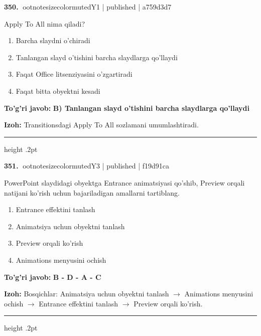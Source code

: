 \documentclass[10pt,a4paper]{article}
\begin{document}
\textbf{\color{ink}350.} {ootnotesizecolor{muted}Y1 | published | a759d3d7}
\par
Apply To All nima qiladi?
\begin{enumerate}[label=\Alph*),leftmargin=9mm]
\item Barcha slaydni o'chiradi
\item Tanlangan slayd o'tishini barcha slaydlarga qo'llaydi
\item Faqat Office litsenziyasini o'zgartiradi
\item Faqat bitta obyektni kesadi
\end{enumerate}
\begin{tcolorbox}[enhanced,breakable,colback=teal!4,colframe=teal!55!black,boxrule=0.45pt,arc=1.2mm,left=2.8mm,right=2.8mm,top=2mm,bottom=2mm]
\textbf{\color{teal}To'g'ri javob:} \textbf{B) Tanlangan slayd o'tishini barcha slaydlarga qo'llaydi}
\par\smallskip
\textbf{Izoh:} Transitionsdagi Apply To All sozlamani umumlashtiradi.
\end{tcolorbox}
\vspace{2mm}\hrule height .2pt\vspace{2mm}

\textbf{\color{ink}351.} {ootnotesizecolor{muted}Y3 | published | f19d91ca}
\par
PowerPoint slaydidagi obyektga Entrance animatsiyasi qo'shib, Preview orqali natijani ko'rish uchun bajariladigan amallarni tartiblang.
\begin{enumerate}[label=\Alph*),leftmargin=9mm]
\item Entrance effektini tanlash
\item Animatsiya uchun obyektni tanlash
\item Preview orqali ko'rish
\item Animations menyusini ochish
\end{enumerate}
\begin{tcolorbox}[enhanced,breakable,colback=teal!4,colframe=teal!55!black,boxrule=0.45pt,arc=1.2mm,left=2.8mm,right=2.8mm,top=2mm,bottom=2mm]
\textbf{\color{teal}To'g'ri javob:} \textbf{B - D - A - C}
\par\smallskip
\textbf{Izoh:} Bosqichlar: Animatsiya uchun obyektni tanlash \ensuremath{\rightarrow} Animations menyusini ochish \ensuremath{\rightarrow} Entrance effektini tanlash \ensuremath{\rightarrow} Preview orqali ko'rish.
\end{tcolorbox}
\vspace{2mm}\hrule height .2pt\vspace{2mm}
\end{document}
